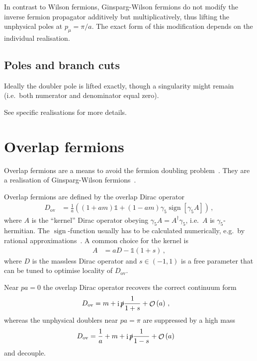\documentclass[a4paper]{article}
\DeclareMathOperator{\im}{i}
\DeclareMathOperator{\sign}{sign}
\DeclareMathOperator{\ord}{\mathcal{O}}
\newcommand{\ordnung}[1]{\ensuremath{\ord\left(#1\right)}}
\begin{document}
	In contrast to Wilson fermions, Ginsparg-Wilson fermions do not modify the inverse fermion propagator additively but multiplicatively, thus lifting the unphysical poles at $p_\mu = \pi/a$. The exact form of this modification depends on the individual realisation.
	
	\subsection{Poles and branch cuts}
	Ideally the doubler pole is lifted exactly, though a singularity might remain (i.e.\ both numerator and denominator equal zero).
	
	See specific realisations for more details.
	
	\section{Overlap fermions}
	Overlap fermions are a means to avoid the fermion doubling problem~\cite{overlap_1998,Gattringer:2010zz,JANSEN2002191,Intro_chiral_sym,JANSEN2005362}. They are a realisation of Ginsparg-Wilson fermions~\cite{Ginsparg_Wilson}.
	
	Overlap fermions are defined by the overlap Dirac operator
	\begin{align}
		D_{\text{ov}} &= \frac1a \left(\left(1+am\right)\mathds 1 + \left(1-am\right)\gamma_5\sign[\gamma_5 A]\right)\,,
	\end{align}
	where $A$ is the ``kernel'' Dirac operator obeying $\gamma_5 A = A^\dagger\gamma_5$, i.e.\ $A$ is $\gamma_5$-hermitian. The $\sign$-function usually has to be calculated numerically, e.g.\ by rational approximations~\cite{kennedy2012algorithms}. A common choice for the kernel is
	\begin{align}
		A &= aD - \mathds 1(1+s)\,,
	\end{align}
	where $D$ is the massless Dirac operator and $s\in\left(-1,1\right)$ is a free parameter that can be tuned to optimise locality of $D_\text{ov}$.
	
	Near $pa=0$ the overlap Dirac operator recovers the correct continuum form
	\begin{align}
		D_\text{ov} &= m+\im\slashed p\frac{1}{1+s}+\ordnung{a}\,,
	\end{align}
	whereas the unphysical doublers near $pa=\pi$ are suppressed by a high mass
	\begin{align}
		D_\text{ov} &= \frac1a+m+\im\slashed p\frac{1}{1-s}+\ordnung{a}
	\end{align}
	and decouple.
	
\end{document}
